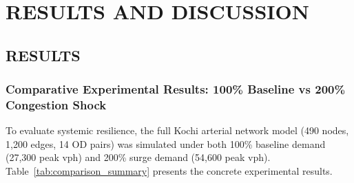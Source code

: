 \documentclass[12pt,a4paper]{report}
\begin{document}
\chapter{RESULTS AND DISCUSSION}
\label{chap:results}

\section{RESULTS}

\subsection*{Comparative Experimental Results: 100\% Baseline vs 200\% Congestion Shock}
To evaluate systemic resilience, the full Kochi arterial network model (490 nodes, 1,200 edges, 14 OD pairs) was simulated under both 100\% baseline demand (27,300 peak vph) and 200\% surge demand (54,600 peak vph). Table~\ref{tab:comparison_summary} presents the concrete experimental results.
\end{document}
